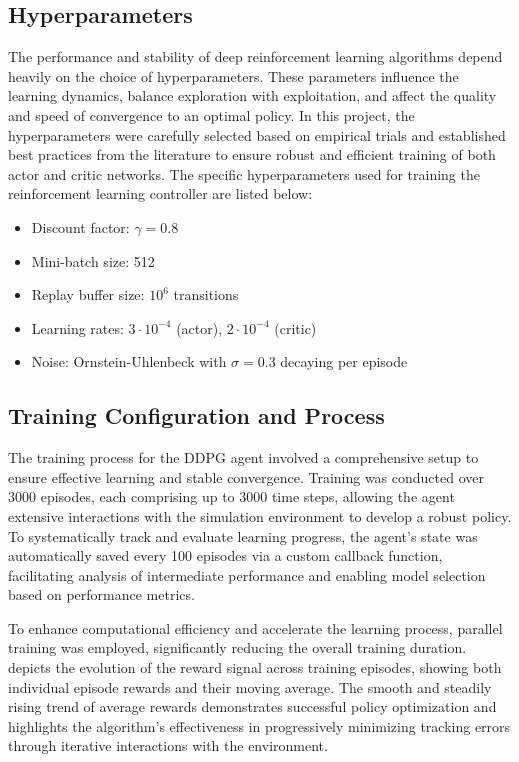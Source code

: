 \subsection{Hyperparameters}

The performance and stability of deep reinforcement learning algorithms depend heavily on the choice of hyperparameters. These parameters influence the learning dynamics, balance exploration with exploitation, and affect the quality and speed of convergence to an optimal policy. In this project, the hyperparameters were carefully selected based on empirical trials and established best practices from the literature to ensure robust and efficient training of both actor and critic networks. The specific hyperparameters used for training the reinforcement learning controller are listed below:

\begin{itemize}
    \item Discount factor: $\gamma = 0.8$
    \item Mini-batch size: 512
    \item Replay buffer size: $10^6$ transitions
    \item Learning rates: $3 \cdot 10^{-4}$ (actor), $2 \cdot 10^{-4}$ (critic)
    \item Noise: Ornstein-Uhlenbeck with $\sigma = 0.3$ decaying per episode
\end{itemize}

\subsection{Training Configuration and Process}

The training process for the DDPG agent involved a comprehensive setup to ensure effective learning and stable convergence. Training was conducted over 3000 episodes, each comprising up to 3000 time steps, allowing the agent extensive interactions with the simulation environment to develop a robust policy. To systematically track and evaluate learning progress, the agent's state was automatically saved every 100 episodes via a custom callback function, facilitating analysis of intermediate performance and enabling model selection based on performance metrics.

To enhance computational efficiency and accelerate the learning process, parallel training was employed, significantly reducing the overall training duration.  depicts the evolution of the reward signal across training episodes, showing both individual episode rewards and their moving average. The smooth and steadily rising trend of average rewards demonstrates successful policy optimization and highlights the algorithm's effectiveness in progressively minimizing tracking errors through iterative interactions with the environment.

